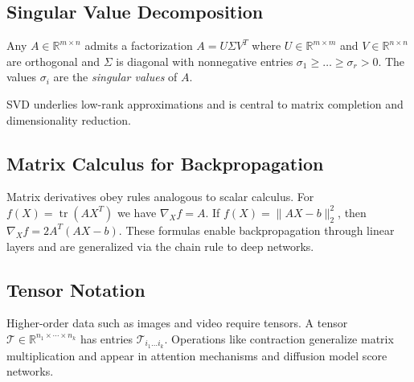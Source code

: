 \subsection{Singular Value Decomposition}
\begin{theorem}
Any $A\in\mathbb{R}^{m\times n}$ admits a factorization $A=U\Sigma V^T$ where $U\in\mathbb{R}^{m\times m}$ and $V\in\mathbb{R}^{n\times n}$ are orthogonal and $\Sigma$ is diagonal with nonnegative entries $\sigma_1\ge\dots\ge\sigma_r>0$. The values $\sigma_i$ are the \emph{singular values} of $A$.
\end{theorem}
SVD underlies low-rank approximations and is central to matrix completion and dimensionality reduction.

\subsection{Matrix Calculus for Backpropagation}
Matrix derivatives obey rules analogous to scalar calculus. For $f(X)=\operatorname{tr}(AX^T)$ we have $\nabla_X f=A$. If $f(X)=\|AX-b\|_2^2$, then $\nabla_X f=2A^T(AX-b)$. These formulas enable backpropagation through linear layers and are generalized via the chain rule to deep networks.

\subsection{Tensor Notation}
Higher-order data such as images and video require tensors. A tensor $\mathcal{T}\in\mathbb{R}^{n_1\times\cdots\times n_k}$ has entries $\mathcal{T}_{i_1\dots i_k}$. Operations like contraction generalize matrix multiplication and appear in attention mechanisms and diffusion model score networks.

